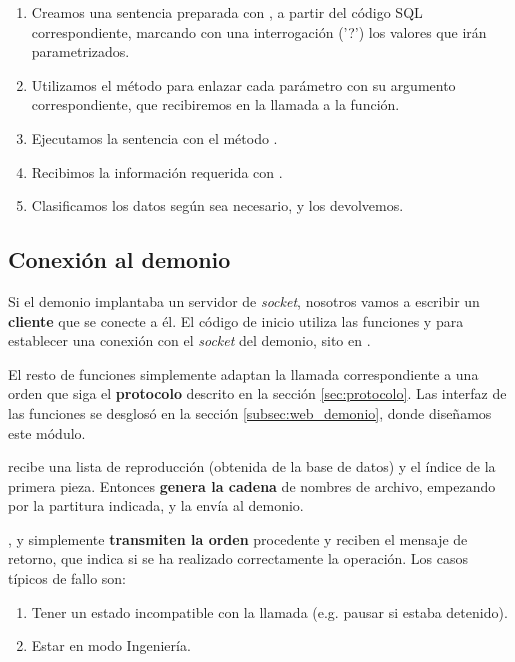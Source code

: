 \begin{enumerate}
	\item Creamos una sentencia preparada con , a partir del código SQL correspondiente, marcando con una interrogación ('?') los valores que irán parametrizados.
	\item Utilizamos el método  para enlazar cada parámetro con su argumento correspondiente, que recibiremos en la llamada a la función.
	\item Ejecutamos la sentencia con el método .
	\item Recibimos la información requerida con .
	\item Clasificamos los datos según sea necesario, y los devolvemos.
\end{enumerate}

\subsection{Conexión al demonio}

Si el demonio implantaba un servidor de \textit{socket}, nosotros vamos a escribir un \textbf{cliente} que se conecte a él. El código de inicio utiliza las funciones  y  para establecer una conexión con el \textit{socket} del demonio, sito en .

El resto de funciones simplemente adaptan la llamada correspondiente a una orden que siga el \textbf{protocolo} descrito en la sección \ref{sec:protocolo}. Las interfaz de las funciones se desglosó en la sección \ref{subsec:web_demonio}, donde diseñamos este módulo.

 recibe una lista de reproducción (obtenida de la base de datos) y el índice de la primera pieza. Entonces \textbf{genera la cadena} de nombres de archivo, empezando por la partitura indicada, y la envía al demonio.

,  y  simplemente \textbf{transmiten la orden} procedente y reciben el mensaje de retorno, que indica si se ha realizado correctamente la operación. Los casos típicos de fallo son:

\begin{enumerate}
	\item Tener un estado incompatible con la llamada (e.g. pausar si estaba detenido).
	\item Estar en modo Ingeniería.
\end{enumerate}

